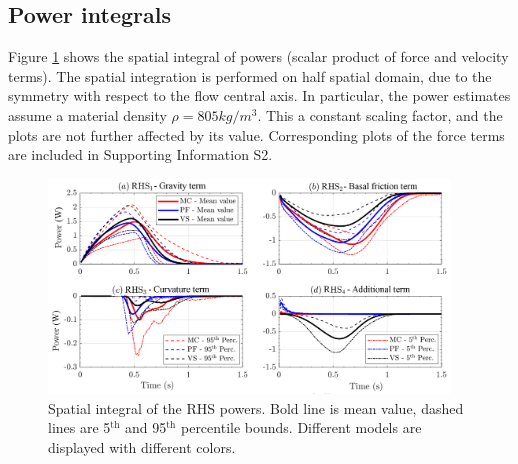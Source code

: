 \documentclass{article}
\begin{document}
\subsection{Power integrals}
Figure \ref{fig:Ramp-Power-spatial} shows the spatial integral of powers (scalar product of force and velocity terms). The spatial integration is performed on half spatial domain, due to the symmetry with respect to the flow central axis. In particular, the power estimates assume a material density $\rho = 805 kg/m^3$. This a constant scaling factor, and the plots are not further affected by its value. Corresponding plots of the force terms are included in Supporting Information S2.
\begin{figure}[H]
        \centering
        \includegraphics[width=0.95\textwidth]{figures/incline/PowersIncline.png}
        \caption{Spatial integral of the RHS powers. Bold line is mean value, dashed lines are 5$^{\mathrm{th}}$ and 95$^{\mathrm{th}}$ percentile bounds. Different models are displayed with different colors.}
        \label{fig:Ramp-Power-spatial}
\end{figure}
\end{document}
